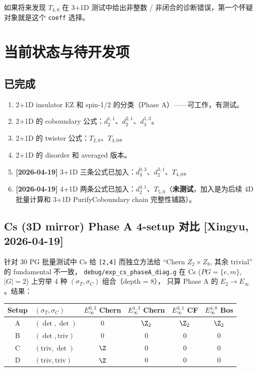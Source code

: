 \documentclass[a4paper,fontset=ubuntu,12pt]{ctexart}
\newcommand{\aT}{\sigma_T}
\newcommand{\aC}{\sigma_C}
\begin{document}
如果将来发现 $T_{4,0}$ 在 3+1D 测试中给出非整数 / 非闭合的诊断错误，第一个怀疑对象就是这个 \texttt{coeff} 选择。

\section{当前状态与待开发项}
\label{sec:status}

\subsection{已完成}

\begin{enumerate}
\item 2+1D insulator EZ 和 spin-1/2 的分类（Phase A）——可工作，有测试。
\item 2+1D 的 coboundary 公式：$d_2^{1,1}$、$d_2^{2,1}$、$d_3^{1,3}$。
\item 2+1D 的 twister 公式：$T_{2,0}$、$T_{3,0}$。
\item 2+1D 的 disorder 和 averaged 版本。
\item \textbf{[2026-04-19]} 3+1D 三条公式已加入：$d_3^{0,3}$、$d_2^{3,1}$、$T_{4,0}$。
\item \textbf{[2026-04-19]} 4+1D 两条公式已加入：$d_2^{4,1}$、$T_{5,0}$（\textbf{未测试}，加入是为后续 4D 批量计算和 3+1D PurifyCoboundary chain 完整性铺路）。
\end{enumerate}

\subsection{Cs (3D mirror) Phase A 4-setup 对比 \textmd{[Xingyu, 2026-04-19]}}
\label{sec:cs_setup_compare}

针对 30 PG 批量测试中 Cs 给 \texttt{[2,4]} 而独立方法给 ``Chern $Z_2 \times Z_8$, 其余 trivial'' 的 fundamental 不一致，
\texttt{debug/exp\_cs\_phaseA\_diag.g} 在 Cs ($PG = \{e, m\}$, $|G| = 2$) 上穷举 4 种 $(\aT, \aC)$ 组合（depth = 8），
只算 Phase A 的 $E_2 \to E_\infty$。结果：

\begin{center}
\renewcommand{\arraystretch}{1.2}
\begin{tabular}{|c|l|c|c|c|c|}
\hline
Setup & $(\aT, \aC)$ & $E_\infty^{0,3}$ Chern & $E_\infty^{1,3}$ Chern & $E_\infty^{3,1}$ CF & $E_\infty^{4,0}$ Bos \\
\hline
A & $(\det, \det)$ & $0$ & $\Z_2$ & $\Z_2$ & $\Z_2$ \\
B & $(\det, \mathrm{triv})$ & $0$ & $0$ & $0$ & $0$ \\
C & $(\mathrm{triv}, \det)$ & $\Z$ & $0$ & $0$ & $0$ \\
D & $(\mathrm{triv}, \mathrm{triv})$ & $\Z$ & $0$ & $0$ & $0$ \\
\hline
\end{tabular}
\end{center}
\end{document}
